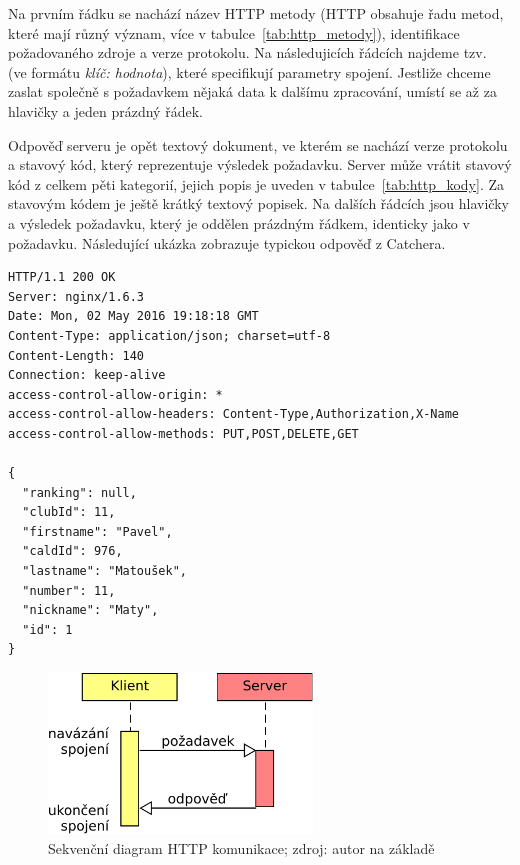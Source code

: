 Na prvním řádku se nachází název HTTP metody (HTTP obsahuje řadu metod, které mají různý význam, více v tabulce~\ref{tab:http_metody}),
identifikace požadovaného zdroje a verze protokolu. Na následujicích řádcích najdeme tzv.~
(ve formátu \textit{klíč: hodnota}), které specifikují parametry spojení. Jestliže chceme zaslat společně s požadavkem
nějaká data k dalšímu zpracování, umístí se až za hlavičky a jeden prázdný řádek.

Odpověď serveru je opět textový dokument, ve kterém se nachází verze protokolu a stavový kód,
který reprezentuje výsledek požadavku. Server může vrátit stavový kód z celkem pěti kategorií,
jejich popis je uveden v tabulce~\ref{tab:http_kody}. Za stavovým kódem je ještě krátký textový popisek. Na dalších
řádcích jsou hlavičky a výsledek požadavku, který je oddělen prázdným řádkem, identicky jako v požadavku.
Následující ukázka zobrazuje typickou odpověď z Catchera. 

\begingroup
\fontsize{9.5pt}{11pt}\selectfont
\begin{verbatim}
HTTP/1.1 200 OK
Server: nginx/1.6.3
Date: Mon, 02 May 2016 19:18:18 GMT
Content-Type: application/json; charset=utf-8
Content-Length: 140
Connection: keep-alive
access-control-allow-origin: *
access-control-allow-headers: Content-Type,Authorization,X-Name
access-control-allow-methods: PUT,POST,DELETE,GET

{
  "ranking": null,
  "clubId": 11,
  "firstname": "Pavel",
  "caldId": 976,
  "lastname": "Matoušek",
  "number": 11,
  "nickname": "Maty",
  "id": 1
}
\end{verbatim}
\endgroup
 
 \begin{figure}[ht!]
\centering
\includegraphics[width=70mm]{./images/http-komunikace.pdf}
\caption{Sekvenční diagram HTTP komunikace; zdroj: autor na základě~\cite{rest_vse}\label{overflow}}
\end{figure}

